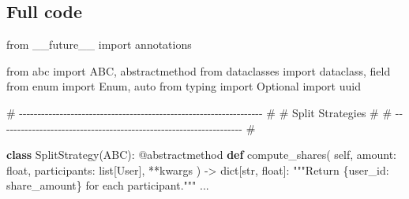 \documentclass[11pt]{article}
\newenvironment{Shaded}{\begin{snugshade}}{\end{snugshade}}
\newcommand{\AttributeTok}[1]{\textcolor[rgb]{0.16,0.50,0.73}{#1}}
\newcommand{\BuiltInTok}[1]{\textcolor[rgb]{0.50,0.55,0.55}{#1}}
\newcommand{\CommentTok}[1]{\textcolor[rgb]{0.48,0.49,0.49}{#1}}
\newcommand{\ImportTok}[1]{\textcolor[rgb]{0.15,0.68,0.38}{#1}}
\newcommand{\KeywordTok}[1]{\textcolor[rgb]{0.81,0.81,0.76}{\textbf{#1}}}
\newcommand{\NormalTok}[1]{\textcolor[rgb]{0.81,0.81,0.76}{#1}}
\newcommand{\OperatorTok}[1]{\textcolor[rgb]{0.81,0.81,0.76}{#1}}
\newcommand{\VariableTok}[1]{\textcolor[rgb]{0.15,0.68,0.68}{#1}}
\begin{document}
\subsection{Full code}\label{full-code-3}


\begin{Shaded}
\begin{Highlighting}[]
\ImportTok{from}\NormalTok{ \_\_future\_\_ }\ImportTok{import}\NormalTok{ annotations}

\ImportTok{from}\NormalTok{ abc }\ImportTok{import}\NormalTok{ ABC, abstractmethod}
\ImportTok{from}\NormalTok{ dataclasses }\ImportTok{import}\NormalTok{ dataclass, field}
\ImportTok{from}\NormalTok{ enum }\ImportTok{import}\NormalTok{ Enum, auto}
\ImportTok{from}\NormalTok{ typing }\ImportTok{import}\NormalTok{ Optional}
\ImportTok{import}\NormalTok{ uuid}


\CommentTok{\# {-}{-}{-}{-}{-}{-}{-}{-}{-}{-}{-}{-}{-}{-}{-}{-}{-}{-}{-}{-}{-}{-}{-}{-}{-}{-}{-}{-}{-}{-}{-}{-}{-}{-}{-}{-}{-}{-}{-}{-}{-}{-}{-}{-}{-}{-}{-}{-}{-}{-}{-}{-}{-}{-}{-}{-}{-}{-}{-}{-}{-}{-}{-}{-}{-}{-} \#}
\CommentTok{\# Split Strategies                                                    \#}
\CommentTok{\# {-}{-}{-}{-}{-}{-}{-}{-}{-}{-}{-}{-}{-}{-}{-}{-}{-}{-}{-}{-}{-}{-}{-}{-}{-}{-}{-}{-}{-}{-}{-}{-}{-}{-}{-}{-}{-}{-}{-}{-}{-}{-}{-}{-}{-}{-}{-}{-}{-}{-}{-}{-}{-}{-}{-}{-}{-}{-}{-}{-}{-}{-}{-}{-}{-}{-} \#}

\KeywordTok{class}\NormalTok{ SplitStrategy(ABC):}
    \AttributeTok{@abstractmethod}
    \KeywordTok{def}\NormalTok{ compute\_shares(}
        \VariableTok{self}\NormalTok{, amount: }\BuiltInTok{float}\NormalTok{, participants: }\BuiltInTok{list}\NormalTok{[User], }\OperatorTok{**}\NormalTok{kwargs}
\NormalTok{    ) }\OperatorTok{{-}\textgreater{}} \BuiltInTok{dict}\NormalTok{[}\BuiltInTok{str}\NormalTok{, }\BuiltInTok{float}\NormalTok{]:}
        \CommentTok{"""Return \{user\_id: share\_amount\} for each participant."""}
\NormalTok{        ...}



\end{Highlighting}
\end{Shaded}
\end{document}
